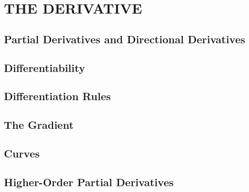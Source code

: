 \section{THE DERIVATIVE}
\subsection{Partial Derivatives and Directional Derivatives}

\subsection{Differentiability}

\subsection{Differentiation Rules}

\subsection{The Gradient}

\subsection{Curves}

\subsection{Higher-Order Partial Derivatives}